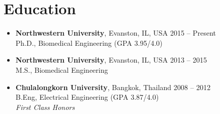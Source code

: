 \section{\sc Education}

\begin{itemize}[leftmargin=0cm, label={}]

\item {\bf Northwestern University}, Evanston, IL, USA \hfill 2015 -- Present \\
Ph.D., Biomedical Engineering \hfill (GPA 3.95/4.0)

\item {\bf Northwestern University}, Evanston, IL, USA \hfill 2013 -- 2015 \\
M.S., Biomedical Engineering

\item {\bf Chulalongkorn University}, Bangkok, Thailand \hfill 2008 -- 2012 \\
B.Eng, Electrical Engineering \hfill (GPA 3.87/4.0)\\
{\em First Class Honors}

\end{itemize}
